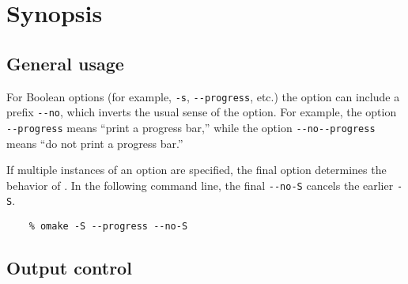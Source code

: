 %
\chapter{Synopsis}
\label{chapter:options}

     

%
\section{General usage}

For Boolean options (for example, \verb+-s+, \verb+--progress+, etc.) the option can include a
prefix \verb+--no+, which inverts the usual sense of the option.  For example, the option
\verb+--progress+ means ``print a progress bar,''  while the option \verb+--no--progress+ means
``do not print a progress bar.''

If multiple instances of an option are specified, the final option determines the behavior of \OMake{}.
In the following command line, the final \verb+--no-S+ cancels the earlier \verb+-S+.

\begin{verbatim}
    % omake -S --progress --no-S
\end{verbatim}

\section{Output control}

